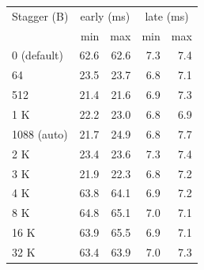 \begin{tabular}{lrrrr}
\toprule
Stagger (B) & \multicolumn{2}{c}{early (ms)} & \multicolumn{2}{c}{late (ms)} \\
 & min & max & min & max \\
\midrule
0 (default) & 62.6 & 62.6 & 7.3 & 7.4 \\
64 & 23.5 & 23.7 & 6.8 & 7.1 \\
512 & 21.4 & 21.6 & 6.9 & 7.3 \\
1 K & 22.2 & 23.0 & 6.8 & 6.9 \\
1088 (auto) & 21.7 & 24.9 & 6.8 & 7.7 \\
2 K & 23.4 & 23.6 & 7.3 & 7.4 \\
3 K & 21.9 & 22.3 & 6.8 & 7.2 \\
4 K & 63.8 & 64.1 & 6.9 & 7.2 \\
8 K & 64.8 & 65.1 & 7.0 & 7.1 \\
16 K & 63.9 & 65.5 & 6.9 & 7.1 \\
32 K & 63.4 & 63.9 & 7.0 & 7.3 \\
\bottomrule
\end{tabular}
